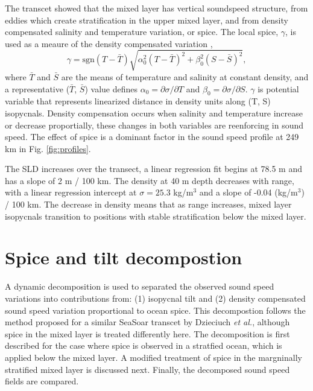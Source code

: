 \documentclass[preprint,NumberedRefs]{JASA}
\begin{document}
The transcet showed that the mixed layer has vertical soundspeed structure, from eddies which create stratification in the upper mixed layer, and from density compensated salinity and temperature variation, or spice. The local spice, $\gamma$, is used as a meaure of the density compensated variation \citep{klymak2015spice},
\begin{equation}
    \gamma=\textrm{sgn}(T-\bar{T}) \sqrt{\alpha_0^2(T-\bar{T})^2 +\beta_0^2(S-\bar{S})^2},
    \label{eq:gamma}
\end{equation}
where $\bar{T}$ and $\bar{S}$ are the means of temperature and salinity at constant density, and a representative ($\bar{T}$, $\bar{S}$) value defines $\alpha_0=\partial \sigma / \partial T$ and $\beta_0=\partial \sigma / \partial S$. $\gamma$ is potential variable that represents linearized distance in density units along (T, S) isopycnals. Density compensation occurs when salinity and temperature increase or decrease proportially, these changes in both variables are reenforcing in sound speed. The effect of spice is a dominant factor in the sound speed profile at 249 km in Fig. \ref{fig:profiles}.

The SLD increases over the transect, a linear regression fit begins at 78.5 m and has a slope of 2 m / 100 km. The density at 40 m depth decreases with range, with a linear regression intercept at $\sigma=25.3$ kg/m$^3$ and a slope of -0.04 (kg/m$^3$) / 100 km. The decrease in density means that as range increases, mixed layer isopycnals transition to positions with stable stratification below the mixed layer.

\section{\label{sec:decomposition}Spice and tilt decompostion}
A dynamic decomposition is used to separated the observed sound speed variations into contributions from: (1) isopycnal tilt and (2) density compensated sound speed variation proportional to ocean spice. This decompostion follows the method proposed for a similar SeaSoar transcet by Dzieciuch \emph{et al.}\citep{dzieciuch2004}, although spice in the mixed layer is treated differently here. The decomposition is first described for the case where spice is observed in a stratfied ocean, which is applied below the mixed layer. A modified treatment of spice in the margninally stratified mixed layer is discussed next. Finally, the decomposed sound speed fields are compared.
\end{document}
